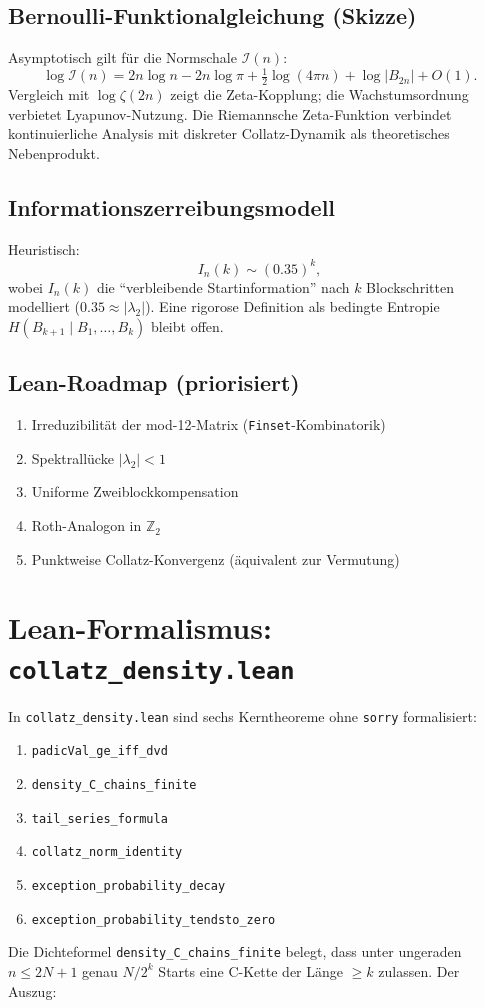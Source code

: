 \documentclass[12pt,a4paper]{article}
\newcommand{\Ztwo}{\mathbb{Z}_2}
\begin{document}
\subsection{Bernoulli-Funktionalgleichung (Skizze)}

Asymptotisch gilt für die Normschale $\mathcal{I}(n)$:
\[
  \log \mathcal{I}(n) = 2n\log n - 2n\log\pi + \tfrac{1}{2}\log(4\pi n) + \log|B_{2n}| + O(1).
\]
Vergleich mit $\log\zeta(2n)$ zeigt die Zeta-Kopplung; die Wachstumsordnung
verbietet Lyapunov-Nutzung. Die Riemannsche Zeta-Funktion verbindet
kontinuierliche Analysis mit diskreter Collatz-Dynamik als theoretisches
Nebenprodukt.

\subsection{Informationszerreibungsmodell}

Heuristisch:
\[
  I_n(k) \sim (0.35)^k,
\]
wobei $I_n(k)$ die ``verbleibende Startinformation'' nach $k$ Blockschritten
modelliert ($0.35 \approx |\lambda_2|$). Eine rigorose Definition als
bedingte Entropie $H(B_{k+1}\mid B_1,\ldots,B_k)$ bleibt offen.

\subsection{Lean-Roadmap (priorisiert)}

\begin{enumerate}
  \item Irreduzibilität der mod-12-Matrix (\texttt{Finset}-Kombinatorik)
  \item Spektrallücke $|\lambda_2| < 1$
  \item Uniforme Zweiblockkompensation
  \item Roth-Analogon in $\Ztwo$
  \item Punktweise Collatz-Konvergenz (äquivalent zur Vermutung)
\end{enumerate}

\section{Lean-Formalismus: \texttt{collatz\_density.lean}}
\label{anhang:lean}

In \texttt{collatz\_density.lean} sind sechs Kerntheoreme ohne
\texttt{sorry} formalisiert:
\begin{enumerate}[label=(\roman*)]
  \item \texttt{padicVal\_ge\_iff\_dvd}
  \item \texttt{density\_C\_chains\_finite}
  \item \texttt{tail\_series\_formula}
  \item \texttt{collatz\_norm\_identity}
  \item \texttt{exception\_probability\_decay}
  \item \texttt{exception\_probability\_tendsto\_zero}
\end{enumerate}

Die Dichteformel \texttt{density\_C\_chains\_finite} belegt, dass unter
ungeraden $n \leq 2N+1$ genau $N/2^k$ Starts eine C-Kette der Länge
$\geq k$ zulassen. Der Auszug:


\end{document}

